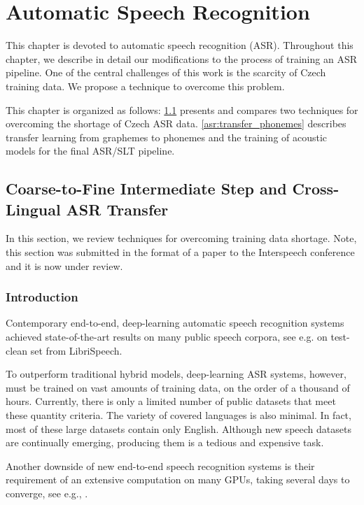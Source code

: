 \chapter{Automatic Speech Recognition}
\label{chapter:asr}

This chapter is devoted to automatic speech recognition (ASR). Throughout this chapter, we describe in detail our modifications to the process of training an ASR pipeline. One of the central challenges of this work is the scarcity of Czech training data. We propose a technique to overcome this problem. 

This chapter is organized as follows: \cref{asr:crosslingual_intermediate} presents and compares two techniques for overcoming the shortage of Czech ASR data. \cref{asr:transfer_phonemes} describes transfer learning from graphemes to phonemes and the training of acoustic models for the final ASR/SLT pipeline. 


\section{Coarse-to-Fine Intermediate Step and Cross-Lin\-gual ASR Transfer}
\label{asr:crosslingual_intermediate}

In this section, we review techniques for overcoming training data shortage. Note, this section was submitted in the format of a paper to the Interspeech conference and it is now under review.

\subsection{Introduction}

Contemporary end-to-end, deep-learning automatic speech recognition systems achie\-ved state-of-the-art results on many public speech corpora, see e.g. 
on test-clean set from LibriSpeech.

To outperform traditional hybrid models, deep-learning ASR systems, however, must be trained on vast amounts of training data, on the order of a thousand of hours. Currently, there is only a limited number of public datasets that meet these quantity criteria. The variety of covered languages is also minimal. In fact, most of these large datasets contain only English. Although new speech datasets are continually emerging, producing them is a tedious and expensive task.

Another downside of new end-to-end speech recognition systems is their requirement of an extensive computation on many GPUs, taking several days to converge, see e.g., . 

